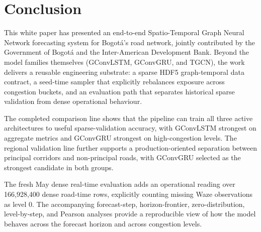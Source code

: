 \documentclass[11pt, a4paper]{article}
\begin{document}
\section{Conclusion}

This white paper has presented an end-to-end Spatio-Temporal Graph Neural Network forecasting system for Bogotá's road network, jointly contributed by the Government of Bogotá and the Inter-American Development Bank. Beyond the model families themselves (GConvLSTM, GConvGRU, and TGCN), the work delivers a reusable engineering substrate: a sparse HDF5 graph-temporal data contract, a seed-time sampler that explicitly rebalances exposure across congestion buckets, and an evaluation path that separates historical sparse validation from dense operational behaviour.

The completed comparison line shows that the pipeline can train all three active architectures to useful sparse-validation accuracy, with GConvLSTM strongest on aggregate metrics and GConvGRU strongest on high-congestion levels. The regional validation line further supports a production-oriented separation between principal corridors and non-principal roads, with GConvGRU selected as the strongest candidate in both groups.

The fresh May dense real-time evaluation adds an operational reading over 166,928,400 dense road-time rows, explicitly counting missing Waze observations as level 0. The accompanying forecast-step, horizon-frontier, zero-distribution, level-by-step, and Pearson analyses provide a reproducible view of how the model behaves across the forecast horizon and across congestion levels.



\end{document}
